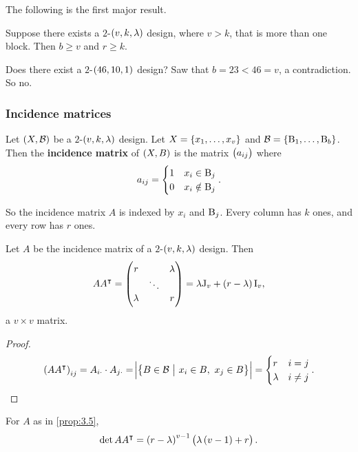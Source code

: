 The following is the first major result.

\begin{theorem}
\label{thm:3.4}
Suppose there exists a $ 2 $-$ \br{v, k, \lambda} $ design, where $ v > k $, that is more than one block. Then $ b \ge v $ and $ r \ge k $.
\end{theorem}


\begin{example*}
Does there exist a $ 2 $-$ \br{46, 10, 1} $ design? Saw that $ b = 23 < 46 = v $, a contradiction. So no.
\end{example*}

\subsubsection{Incidence matrices}

\begin{definition*}
Let $ \br{X, \BBB} $ be a $ 2 $-$ \br{v, k, \lambda} $ design. Let $ X = \cbr{x_1, \dots, x_v} $ and $ \BBB = \cbr{\B_1, \dots, \B_b} $. Then the \textbf{incidence matrix} of $ \br{X, B} $ is the matrix $ \br{a_{ij}} $ where
$$ a_{ij} =
\begin{cases}
1 & x_i \in \mathrm{B}_j \\
0 & x_i \notin \mathrm{B}_j
\end{cases}.
$$
\end{definition*}

So the incidence matrix $ A $ is indexed by $ x_i $ and $ \mathrm{B}_j $. Every column has $ k $ ones, and every row has $ r $ ones.

\begin{proposition}
\label{prop:3.5}
Let $ A $ be the incidence matrix of a $ 2 $-$ \br{v, k, \lambda} $ design. Then
$$ AA^\intercal = \threebythree{r}{}{\lambda}{}{\ddots}{}{\lambda}{}{r} = \lambda \J_v + \br{r - \lambda}\I_v, $$
a $ v \times v $ matrix.
\end{proposition}

\begin{proof}
$$ \br{AA^\intercal}_{ij} = A_{i\cdot} \cdot A_{j\cdot} = \abs{\cbr{B \in \BBB \st x_i \in B, \ x_j \in B}} =
\begin{cases}
r & i = j \\
\lambda & i \ne j
\end{cases}.
$$
\end{proof}

\begin{proposition}
For $ A $ as in \ref{prop:3.5},
$$ \det AA^\intercal = \br{r - \lambda}^{v - 1}\br{\lambda\br{v - 1} + r}. $$
\end{proposition}

